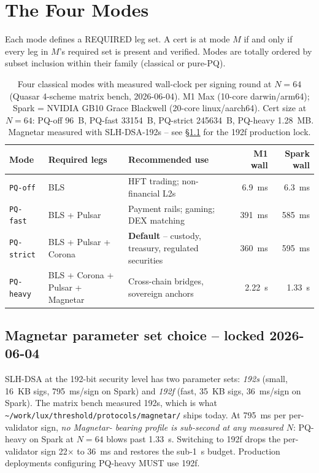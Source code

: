 \section{The Four Modes}
\label{sec:modes}

Each mode defines a REQUIRED leg set. A cert is at mode $M$ if and
only if every leg in $M$'s required set is present and verified.
Modes are totally ordered by subset inclusion within their family
(classical or pure-PQ).

\begin{table}[h]
\centering
\small
\begin{tabular}{@{}lp{3.8cm}p{3.5cm}rr@{}}
\toprule
\textbf{Mode} & \textbf{Required legs} & \textbf{Recommended use} & \textbf{M1 wall} & \textbf{Spark wall} \\
\midrule
\texttt{PQ-off} & BLS & HFT trading; non-financial L2s & \SI{6.9}{\milli\second} & \SI{6.3}{\milli\second} \\
\texttt{PQ-fast} & BLS + Pulsar & Payment rails; gaming; DEX matching & \SI{391}{\milli\second} & \SI{585}{\milli\second} \\
\texttt{PQ-strict} & BLS + Pulsar + Corona & \textbf{Default} -- custody, treasury, regulated securities & \SI{360}{\milli\second} & \SI{595}{\milli\second} \\
\texttt{PQ-heavy} & BLS + Corona + Pulsar + Magnetar & Cross-chain bridges, sovereign anchors & \SI{2.22}{\second} & \SI{1.33}{\second} \\
\bottomrule
\end{tabular}
\caption{Four classical modes with measured wall-clock per signing
round at $N{=}64$ (Quasar 4-scheme matrix bench, 2026-06-04). M1 Max
(10-core darwin/arm64); Spark = NVIDIA GB10 Grace Blackwell
(20-core linux/aarch64). Cert size at $N{=}64$: PQ-off \SI{96}{B},
PQ-fast \SI{33154}{B}, PQ-strict \SI{245634}{B}, PQ-heavy \SI{1.28}{MB}.
Magnetar measured with SLH-DSA-192s -- see \S\ref{sec:magnetar-param}
for the 192f production lock.}
\label{tab:modes}
\end{table}

\subsection{Magnetar parameter set choice -- locked 2026-06-04}
\label{sec:magnetar-param}

SLH-DSA at the 192-bit security level has two parameter sets:
\emph{192s} (small, \SI{16}{KB} sigs, \SI{795}{ms}/sign on Spark) and
\emph{192f} (fast, \SI{35}{KB} sigs, \SI{36}{ms}/sign on Spark). The
matrix bench measured 192s, which is what
\texttt{\textasciitilde/work/lux/threshold/protocols/magnetar/} ships
today. At \SI{795}{ms} per per-validator sign, \emph{no Magnetar-
bearing profile is sub-second at any measured $N$}: PQ-heavy on Spark
at $N{=}64$ blows past \SI{1.33}{s}. Switching to 192f drops the
per-validator sign 22$\times$ to \SI{36}{ms} and restores the
sub-\SI{1}{s} budget. Production deployments configuring PQ-heavy
MUST use 192f.

